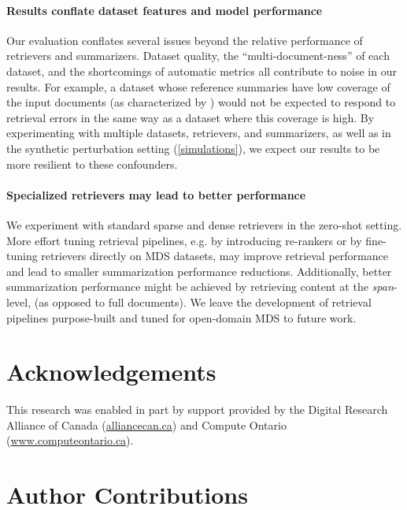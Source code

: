 \documentclass[11pt]{article}
\begin{document}
\paragraph{Results conflate dataset features and model performance}
Our evaluation conflates several issues beyond the relative performance of retrievers and summarizers. Dataset quality, the ``multi-document-ness'' of each dataset, and the shortcomings of automatic metrics all contribute to noise in our results. For example, a dataset whose reference summaries have low coverage of the input documents (as characterized by \citealp{https://doi.org/10.48550/arxiv.2210.12688}) would not be expected to respond to retrieval errors in the same way as a dataset where this coverage is high. By experimenting with multiple datasets, retrievers, and summarizers, as well as in the synthetic perturbation setting (\textsection \ref{simulations}), we expect our results to be more resilient to these confounders.

\paragraph{Specialized retrievers may lead to better performance}
We experiment with standard sparse and dense retrievers in the zero-shot setting. More effort tuning retrieval pipelines, e.g. by introducing re-rankers \citep{Pradeep2021TheED} or by fine-tuning retrievers directly on MDS datasets, may improve retrieval performance and lead to smaller summarization performance reductions. Additionally, better summarization performance might be achieved by retrieving content at the \textit{span}-level, (as opposed to full documents). We leave the development of retrieval pipelines purpose-built and tuned for open-domain MDS to future work.

\section*{Acknowledgements}

This research was enabled in part by support provided by the Digital Research Alliance of Canada (\href{https://alliancecan.ca/}{alliancecan.ca}) and Compute Ontario (\href{https://www.computeontario.ca/}{www.computeontario.ca}).

\section*{Author Contributions}
\label{sec:contrib}
\end{document}
